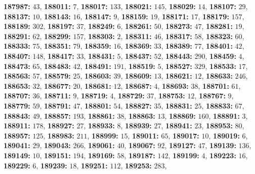 \textsf{\bfseries 187987:} $43$, \textsf{\bfseries 188011:} $7$, \textsf{\bfseries 188017:} $133$, \textsf{\bfseries 188021:} $145$, \textsf{\bfseries 188029:} $14$, \textsf{\bfseries 188107:} $29$, \textsf{\bfseries 188137:} $10$, \textsf{\bfseries 188143:} $16$, \textsf{\bfseries 188147:} $9$, \textsf{\bfseries 188159:} $19$, \textsf{\bfseries 188171:} $17$, \textsf{\bfseries 188179:} $157$, \textsf{\bfseries 188189:} $302$, \textsf{\bfseries 188197:} $37$, \textsf{\bfseries 188249:} $6$, \textsf{\bfseries 188261:} $50$, \textsf{\bfseries 188273:} $47$, \textsf{\bfseries 188281:} $19$, \textsf{\bfseries 188291:} $62$, \textsf{\bfseries 188299:} $157$, \textsf{\bfseries 188303:} $2$, \textsf{\bfseries 188311:} $46$, \textsf{\bfseries 188317:} $58$, \textsf{\bfseries 188323:} $60$, \textsf{\bfseries 188333:} $75$, \textsf{\bfseries 188351:} $79$, \textsf{\bfseries 188359:} $16$, \textsf{\bfseries 188369:} $33$, \textsf{\bfseries 188389:} $77$, \textsf{\bfseries 188401:} $42$, \textsf{\bfseries 188407:} $148$, \textsf{\bfseries 188417:} $33$, \textsf{\bfseries 188431:} $5$, \textsf{\bfseries 188437:} $52$, \textsf{\bfseries 188443:} $290$, \textsf{\bfseries 188459:} $4$, \textsf{\bfseries 188473:} $65$, \textsf{\bfseries 188483:} $42$, \textsf{\bfseries 188491:} $191$, \textsf{\bfseries 188519:} $5$, \textsf{\bfseries 188527:} $329$, \textsf{\bfseries 188533:} $17$, \textsf{\bfseries 188563:} $57$, \textsf{\bfseries 188579:} $25$, \textsf{\bfseries 188603:} $39$, \textsf{\bfseries 188609:} $13$, \textsf{\bfseries 188621:} $12$, \textsf{\bfseries 188633:} $246$, \textsf{\bfseries 188653:} $32$, \textsf{\bfseries 188677:} $20$, \textsf{\bfseries 188681:} $12$, \textsf{\bfseries 188687:} $4$, \textsf{\bfseries 188693:} $38$, \textsf{\bfseries 188701:} $61$, \textsf{\bfseries 188707:} $36$, \textsf{\bfseries 188711:} $9$, \textsf{\bfseries 188719:} $4$, \textsf{\bfseries 188729:} $37$, \textsf{\bfseries 188753:} $12$, \textsf{\bfseries 188767:} $9$, \textsf{\bfseries 188779:} $59$, \textsf{\bfseries 188791:} $47$, \textsf{\bfseries 188801:} $54$, \textsf{\bfseries 188827:} $35$, \textsf{\bfseries 188831:} $25$, \textsf{\bfseries 188833:} $67$, \textsf{\bfseries 188843:} $49$, \textsf{\bfseries 188857:} $193$, \textsf{\bfseries 188861:} $38$, \textsf{\bfseries 188863:} $13$, \textsf{\bfseries 188869:} $160$, \textsf{\bfseries 188891:} $3$, \textsf{\bfseries 188911:} $178$, \textsf{\bfseries 188927:} $27$, \textsf{\bfseries 188933:} $8$, \textsf{\bfseries 188939:} $27$, \textsf{\bfseries 188941:} $23$, \textsf{\bfseries 188953:} $80$, \textsf{\bfseries 188957:} $125$, \textsf{\bfseries 188983:} $211$, \textsf{\bfseries 188999:} $15$, \textsf{\bfseries 189011:} $65$, \textsf{\bfseries 189017:} $10$, \textsf{\bfseries 189019:} $6$, \textsf{\bfseries 189041:} $29$, \textsf{\bfseries 189043:} $266$, \textsf{\bfseries 189061:} $40$, \textsf{\bfseries 189067:} $92$, \textsf{\bfseries 189127:} $47$, \textsf{\bfseries 189139:} $136$, \textsf{\bfseries 189149:} $10$, \textsf{\bfseries 189151:} $194$, \textsf{\bfseries 189169:} $58$, \textsf{\bfseries 189187:} $142$, \textsf{\bfseries 189199:} $4$, \textsf{\bfseries 189223:} $16$, \textsf{\bfseries 189229:} $6$, \textsf{\bfseries 189239:} $18$, \textsf{\bfseries 189251:} $112$, \textsf{\bfseries 189253:} $283$, 
